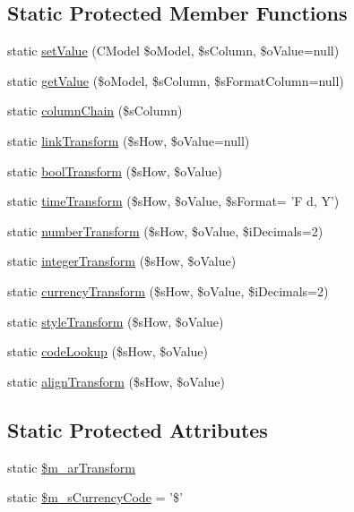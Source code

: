 \subsection*{Static Protected Member Functions}
\begin{DoxyCompactItemize}
\item 
static \hyperlink{classCPSTransform_a1455044b50d1f628be0d635c9da6114a}{setValue} (CModel \$oModel, \$sColumn, \$oValue=null)
\item 
static \hyperlink{classCPSTransform_a9fde2db64e7ddc0307fe950ab660a9cf}{getValue} (\$oModel, \$sColumn, \$sFormatColumn=null)
\item 
static \hyperlink{classCPSTransform_a3fe1ccddc9aeb87c4edafc0c55c07b17}{columnChain} (\$sColumn)
\item 
static \hyperlink{classCPSTransform_af3bdd179e3007dcd172efbb832cca822}{linkTransform} (\$sHow, \$oValue=null)
\item 
static \hyperlink{classCPSTransform_a7491d0a6ec45acde6b8ea3f55766afbe}{boolTransform} (\$sHow, \$oValue)
\item 
static \hyperlink{classCPSTransform_aca8d939a1d46f31565cc285f1219be53}{timeTransform} (\$sHow, \$oValue, \$sFormat= 'F d, Y')
\item 
static \hyperlink{classCPSTransform_a4c967738a3904b14a2f50f331299fa93}{numberTransform} (\$sHow, \$oValue, \$iDecimals=2)
\item 
static \hyperlink{classCPSTransform_a04f8fee4f0dae9c538c23fae82011556}{integerTransform} (\$sHow, \$oValue)
\item 
static \hyperlink{classCPSTransform_a08395eb6a5783fd6d1ebca3ac1673720}{currencyTransform} (\$sHow, \$oValue, \$iDecimals=2)
\item 
static \hyperlink{classCPSTransform_ad86611f0425895db4f816facded1f05b}{styleTransform} (\$sHow, \$oValue)
\item 
static \hyperlink{classCPSTransform_accb985cf2dadc7fe1cf11f1c3cb97250}{codeLookup} (\$sHow, \$oValue)
\item 
static \hyperlink{classCPSTransform_a51a672918b2d46c8f8033f692161414a}{alignTransform} (\$sHow, \$oValue)
\end{DoxyCompactItemize}
\subsection*{Static Protected Attributes}
\begin{DoxyCompactItemize}
\item 
static \hyperlink{classCPSTransform_a02daa717c378ec40ccd5c56792be79b6}{\$m\_\-arTransform}
\item 
static \hyperlink{classCPSTransform_ad005f4e9c81099cb3317e04d8b998492}{\$m\_\-sCurrencyCode} = '\$'
\end{DoxyCompactItemize}


